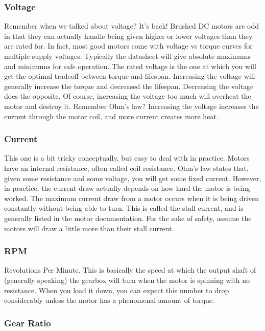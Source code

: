 \subsubsection{Voltage}

Remember when we talked about voltage? It's back! Brushed DC motors are odd in that they can actually handle being given higher or lower voltages than they are rated for. In fact, most good motors come with voltage vs torque curves for multiple supply voltages. Typically the datasheet will give absolute maximums and minimums for safe operation. The rated voltage is the one at which you will get the optimal tradeoff between torque and lifespan. Increasing the voltage will generally increase the torque and decreased the lifespan. Decreasing the voltage does the opposite. Of course, increasing the voltage too much will overheat the motor and destroy it. Remember Ohm's law? Increasing the voltage increases the current through the motor coil, and more current creates more heat.

\subsubsection{Current}

This one is a bit tricky conceptually, but easy to deal with in practice. Motors have an internal resistance, often called coil resistance. Ohm's law states that, given some resistance and some voltage, you will get some fixed current. However, in practice, the current draw actually depends on how hard the motor is being worked. The maximum current draw from a motor occurs when it is being driven constantly without being able to turn. This is called the stall current, and is generally listed in the motor documentation. For the sake of safety, assume the motors will draw a little more than their stall current.

\subsubsection{RPM}

Revolutions Per Minute. This is basically the speed at which the output shaft of (generally speaking) the gearbox will turn when the motor is spinning with no resistance. When you load it down, you can expect this number to drop considerably unless the motor has a phenomenal amount of torque.

\subsubsection{Gear Ratio}

